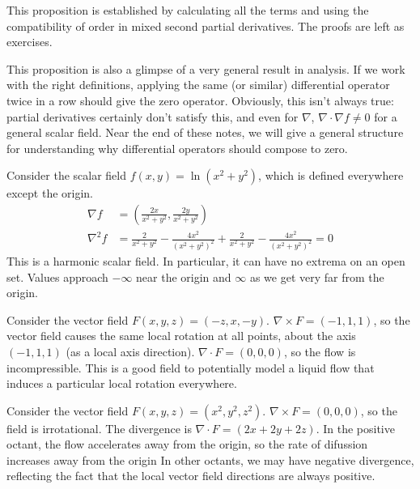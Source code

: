 \documentclass[fleqn,letterpaper]{report}
\begin{document}
This proposition is established by calculating all the
terms and using the compatibility of order in mixed second
partial derivatives. The proofs are left as exercises. 

This proposition is also a 
glimpse of a very general result in analysis. If we work with
the right definitions, applying the same (or similar)
differential operator twice in a row should give the zero
operator. Obviously, this isn't always true:
partial derivatives certainly don't satisfy this, and even for
$\nabla$, $\nabla \cdot \nabla f \neq 0$ for a
general scalar field. Near the end of these notes, we will
give a general structure for understanding why differential
operators should compose to zero. 

\begin{example}
Consider the scalar field $f(x,y) = \ln (x^2 + y^2)$, which is
defined everywhere except the origin. 
\begin{align*}
\nabla f & = \left( \frac{2x}{x^2 + y^2}, \frac{2y}{x^2+y^2}
\right) \\
\nabla^2 f & = \frac{2}{x^2 + y^2} - \frac{4x^2}{(x^2 + y^2)^2} +
\frac{2}{x^2+y^2} - \frac{4x^2}{(x^2+y^2)^2} = 0 
\end{align*}
This is a harmonic scalar field. In particular, it can have
no extrema on an open set. Values approach $-\infty$ near the
origin and $\infty$ as we get very far from the origin.
\end{example}

\begin{example}
Consider the vector field $F(x,y,z) = (-z,x,-y)$. $\nabla
\times F = (-1,1,1)$, so the vector field causes the same
local rotation at all points, about the axis $(-1,1,1)$ (as a
local axis direction). $\nabla \cdot F = (0,0,0)$, so the
flow is incompressible. This is a good field to potentially
model a liquid flow that induces a particular local rotation
everywhere.
\end{example}

\begin{example}
Consider the vector field $F(x,y,z) = (x^2,y^2,z^2)$. $\nabla
\times F = (0,0,0)$, so the field is irrotational. The
divergence is $\nabla \cdot F = (2x +2y+2z)$. In the positive
octant, the flow accelerates away from the origin, so the rate
of difussion increases away from the origin In other octants,
we may have negative divergence, reflecting the fact that the
local vector field directions are always positive.
\end{example}
\end{document}
